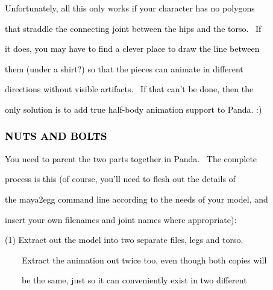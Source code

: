 \documentclass[a4paper]{article}
\newcommand\textstyleOOoComputerKeyWord[1]{\textrm{\textcolor[rgb]{0.0,0.0,0.5019608}{#1}}}
\begin{document}
\bigskip

{\color{black}
\textstyleOOoComputerKeyWord{\textcolor{black}{Unfortunately, all this only works if your character has no polygons}}}

{\color{black}
\textstyleOOoComputerKeyWord{\textcolor{black}{that straddle the connecting joint between the hips and the torso.
\ If}}}

{\color{black}
\textstyleOOoComputerKeyWord{\textcolor{black}{it does, you may have to find a clever place to draw the line between}}}

{\color{black}
\textstyleOOoComputerKeyWord{\textcolor{black}{them (under a shirt?) so that the pieces can animate in different}}}

{\color{black}
\textstyleOOoComputerKeyWord{\textcolor{black}{directions without visible artifacts. \ If that can't be done, then
the}}}

{\color{black}
\textstyleOOoComputerKeyWord{\textcolor{black}{only solution is to add true half-body animation support to Panda. :)}}}


\bigskip

\subsubsection[NUTS AND BOLTS]{\textstyleOOoComputerKeyWord{\textcolor{black}{NUTS AND BOLTS}}}
\hypertarget{RefHeading7905869075401}{}{\color{black}
\textstyleOOoComputerKeyWord{\textcolor{black}{You need to parent the two parts together in Panda. \ The complete}}}

{\color{black}
\textstyleOOoComputerKeyWord{\textcolor{black}{process is this (of course, you'll need to flesh out the details of}}}

{\color{black}
\textstyleOOoComputerKeyWord{\textcolor{black}{the maya2egg command line according to the needs of your model, and}}}

{\color{black}
\textstyleOOoComputerKeyWord{\textcolor{black}{insert your own filenames and joint names where appropriate):}}}


\bigskip

{\color{black}
\textstyleOOoComputerKeyWord{\textcolor{black}{(1) Extract out the model into two separate files, legs and torso.}}}

{\color{black}
\textstyleOOoComputerKeyWord{\textcolor{black}{\ \ \ \ Extract the animation out twice too, even though both copies
will}}}

{\color{black}
\textstyleOOoComputerKeyWord{\textcolor{black}{\ \ \ \ be the same, just so it can conveniently exist in two
different}}}
\end{document}
